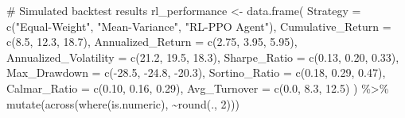 \documentclass[
  10pt,
  a4paper,
]{article}
\newenvironment{Shaded}{\begin{snugshade}}{\end{snugshade}}
\newcommand{\AttributeTok}[1]{\textcolor[rgb]{0.40,0.45,0.13}{#1}}
\newcommand{\CommentTok}[1]{\textcolor[rgb]{0.37,0.37,0.37}{#1}}
\newcommand{\DecValTok}[1]{\textcolor[rgb]{0.68,0.00,0.00}{#1}}
\newcommand{\FloatTok}[1]{\textcolor[rgb]{0.68,0.00,0.00}{#1}}
\newcommand{\FunctionTok}[1]{\textcolor[rgb]{0.28,0.35,0.67}{#1}}
\newcommand{\NormalTok}[1]{\textcolor[rgb]{0.00,0.23,0.31}{#1}}
\newcommand{\OtherTok}[1]{\textcolor[rgb]{0.00,0.23,0.31}{#1}}
\newcommand{\SpecialCharTok}[1]{\textcolor[rgb]{0.37,0.37,0.37}{#1}}
\newcommand{\StringTok}[1]{\textcolor[rgb]{0.13,0.47,0.30}{#1}}
\begin{document}
\begin{Shaded}
\begin{Highlighting}[]
\CommentTok{\# Simulated backtest results}
\NormalTok{rl\_performance }\OtherTok{\textless{}{-}} \FunctionTok{data.frame}\NormalTok{(}
  \AttributeTok{Strategy =} \FunctionTok{c}\NormalTok{(}\StringTok{"Equal{-}Weight"}\NormalTok{, }\StringTok{"Mean{-}Variance"}\NormalTok{, }\StringTok{"RL{-}PPO Agent"}\NormalTok{),}
  \AttributeTok{Cumulative\_Return =} \FunctionTok{c}\NormalTok{(}\FloatTok{8.5}\NormalTok{, }\FloatTok{12.3}\NormalTok{, }\FloatTok{18.7}\NormalTok{),}
  \AttributeTok{Annualized\_Return =} \FunctionTok{c}\NormalTok{(}\FloatTok{2.75}\NormalTok{, }\FloatTok{3.95}\NormalTok{, }\FloatTok{5.95}\NormalTok{),}
  \AttributeTok{Annualized\_Volatility =} \FunctionTok{c}\NormalTok{(}\FloatTok{21.2}\NormalTok{, }\FloatTok{19.5}\NormalTok{, }\FloatTok{18.3}\NormalTok{),}
  \AttributeTok{Sharpe\_Ratio =} \FunctionTok{c}\NormalTok{(}\FloatTok{0.13}\NormalTok{, }\FloatTok{0.20}\NormalTok{, }\FloatTok{0.33}\NormalTok{),}
  \AttributeTok{Max\_Drawdown =} \FunctionTok{c}\NormalTok{(}\SpecialCharTok{{-}}\FloatTok{28.5}\NormalTok{, }\SpecialCharTok{{-}}\FloatTok{24.8}\NormalTok{, }\SpecialCharTok{{-}}\FloatTok{20.3}\NormalTok{),}
  \AttributeTok{Sortino\_Ratio =} \FunctionTok{c}\NormalTok{(}\FloatTok{0.18}\NormalTok{, }\FloatTok{0.29}\NormalTok{, }\FloatTok{0.47}\NormalTok{),}
  \AttributeTok{Calmar\_Ratio =} \FunctionTok{c}\NormalTok{(}\FloatTok{0.10}\NormalTok{, }\FloatTok{0.16}\NormalTok{, }\FloatTok{0.29}\NormalTok{),}
  \AttributeTok{Avg\_Turnover =} \FunctionTok{c}\NormalTok{(}\FloatTok{0.0}\NormalTok{, }\FloatTok{8.3}\NormalTok{, }\FloatTok{12.5}\NormalTok{)}
\NormalTok{) }\SpecialCharTok{\%\textgreater{}\%}
  \FunctionTok{mutate}\NormalTok{(}\FunctionTok{across}\NormalTok{(}\FunctionTok{where}\NormalTok{(is.numeric), }\SpecialCharTok{\textasciitilde{}}\FunctionTok{round}\NormalTok{(., }\DecValTok{2}\NormalTok{)))}


\end{Highlighting}
\end{Shaded}
\end{document}
